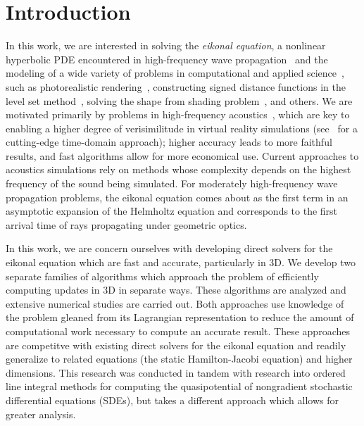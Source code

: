 \documentclass[eikonal.tex]{subfiles}
\begin{document}
\section{Introduction}\label{sec:introduction}

In this work, we are interested in solving the \emph{eikonal
  equation}, a nonlinear hyperbolic PDE encountered in high-frequency
wave propagation~\cite{engquist2003computational} and the modeling of
a wide variety of problems in computational and applied
science~\cite{sethian1999level}, such as photorealistic
rendering~\cite{ihrke2007eikonal}, constructing signed distance
functions in the level set method~\cite{osher2006level}, solving the
shape from shading
problem~\cite{kimmel2001optimal,prados2006shape,durou2008numerical},
and others. We are motivated primarily by problems in high-frequency
acoustics~\cite{prislan2016ray}, which are key to enabling a higher
degree of verisimilitude in virtual reality simulations
(see~\cite{raghuvanshi2014parametric,raghuvanshi2018parametric} for a
cutting-edge time-domain approach); higher accuracy leads to more
faithful results, and fast algorithms allow for more economical
use. Current approaches to acoustics simulations rely on methods whose
complexity depends on the highest frequency of the sound being
simulated. For moderately high-frequency wave propagation problems,
the eikonal equation comes about as the first term in an asymptotic
expansion of the Helmholtz equation and corresponds to the first
arrival time of rays propagating under geometric optics.

In this work, we are concern ourselves with developing direct solvers
for the eikonal equation which are fast and accurate, particularly in
3D. We develop two separate families of algorithms which approach the
problem of efficiently computing updates in 3D in separate ways. These
algorithms are analyzed and extensive numerical studies are carried
out. Both approaches use knowledge of the problem gleaned from its
Lagrangian representation to reduce the amount of computational work
necessary to compute an accurate result. These approaches are
competitve with existing direct solvers for the eikonal equation and
readily generalize to related equations (the static Hamilton-Jacobi
equation) and higher dimensions. This research was conducted in tandem
with research into ordered line integral methods for computing the
quasipotential of nongradient stochastic differential equations
(SDEs), but takes a different approach which allows for greater
analysis.
\end{document}
